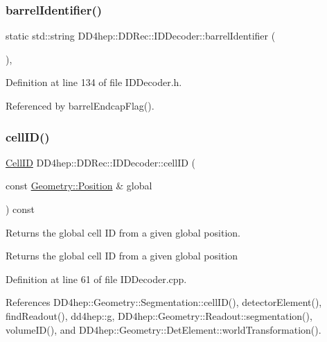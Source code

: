 \subsubsection{\texorpdfstring{barrel\+Identifier()}{barrelIdentifier()}}
{\footnotesize\ttfamily static std\+::string D\+D4hep\+::\+D\+D\+Rec\+::\+I\+D\+Decoder\+::barrel\+Identifier (\begin{DoxyParamCaption}{ }\end{DoxyParamCaption})\hspace{0.3cm}{\ttfamily [inline]}, {\ttfamily [static]}}



Definition at line 134 of file I\+D\+Decoder.\+h.



Referenced by barrel\+Endcap\+Flag().

\hypertarget{class_d_d4hep_1_1_d_d_rec_1_1_i_d_decoder_abdd26643ae2f9f70de21b3a4699799bb}{}\label{class_d_d4hep_1_1_d_d_rec_1_1_i_d_decoder_abdd26643ae2f9f70de21b3a4699799bb} 
\subsubsection{\texorpdfstring{cell\+I\+D()}{cellID()}}
{\footnotesize\ttfamily \hyperlink{namespace_d_d4hep_1_1_d_d_rec_af5cecc2e566eeaedb430b92df23971d4}{Cell\+ID} D\+D4hep\+::\+D\+D\+Rec\+::\+I\+D\+Decoder\+::cell\+ID (\begin{DoxyParamCaption}\item[{const \hyperlink{namespace_d_d4hep_1_1_geometry_a55083902099d03506c6db01b80404900}{Geometry\+::\+Position} \&}]{global }\end{DoxyParamCaption}) const}



Returns the global cell ID from a given global position. 

Returns the global cell ID from a given global position 

Definition at line 61 of file I\+D\+Decoder.\+cpp.



References D\+D4hep\+::\+Geometry\+::\+Segmentation\+::cell\+I\+D(), detector\+Element(), find\+Readout(), dd4hep\+::g, D\+D4hep\+::\+Geometry\+::\+Readout\+::segmentation(), volume\+I\+D(), and D\+D4hep\+::\+Geometry\+::\+Det\+Element\+::world\+Transformation().



